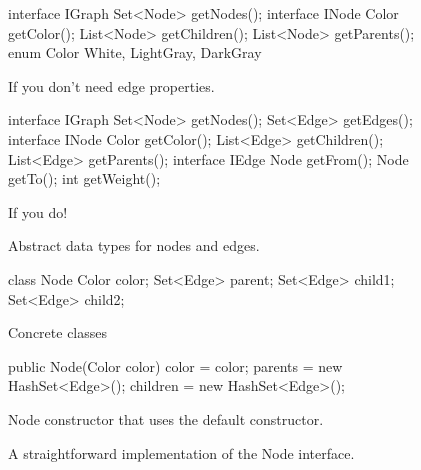 \begin{figure}
\centering
\begin{subfloat}
\label{fig:graph-interfaces}
\begin{minipage}[b]{0.45\textwidth}
\begin{framedlisting}
interface IGraph {
	Set<Node> getNodes();
}
interface INode {
	Color getColor();
	List<Node> getChildren();
	List<Node> getParents();
}
enum Color {
	White, LightGray, DarkGray
}
\end{framedlisting}
\end{minipage}
\caption{If you don't need edge properties.}
\end{subfloat}
\begin{subfloat}
\label{fig:graph-interfaces}
\begin{minipage}[b]{0.45\textwidth}
\begin{framedlisting}
interface IGraph {
   Set<Node> getNodes();
   Set<Edge> getEdges();
}
interface INode {
   Color getColor();
   List<Edge> getChildren();
   List<Edge> getParents();
}
interface IEdge {
   Node getFrom();
   Node getTo();
   int getWeight();
}
\end{framedlisting}
\end{minipage}
\caption{If you do!}
\end{subfloat}
\caption{Abstract data types for nodes and edges.}
\label{fig:graph-interfaces}
\end{figure}

\begin{figure}
\centering
\begin{subfloat}
\begin{minipage}[b]{0.3\textwidth}
\begin{framedlisting}
class Node {
   Color color;
   Set<Edge> parent;
   Set<Edge> child1;
   Set<Edge> child2;
}
\end{framedlisting}
\end{minipage}
\caption{Concrete classes}
\end{subfloat}
\quad
\begin{subfloat}
\label{fig:node-obvious-constructor}
\begin{minipage}[b]{0.5\textwidth}
\begin{framedlisting}
public Node(Color color) {
   color = color;
   parents = new HashSet<Edge>();
   children = new HashSet<Edge>();
}
\end{framedlisting}
\end{minipage}
\caption{Node constructor that uses the default  constructor.}
\end{subfloat}
\caption{A straightforward implementation of the Node interface.}
\label{fig:node-obvious-impl}
\end{figure}

